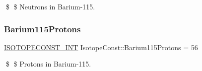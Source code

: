 \$ \$ Neutrons in Barium-\/115. \mbox{\label{group___isotope_const-_barium-_ba115_ga52f793fb7bcf6d774c15a76118316223}} 
\subsubsection{\texorpdfstring{Barium115\+Protons}{Barium115Protons}}
{\footnotesize\ttfamily \mbox{\hyperlink{group___isotope_const-_macros_ga5f18360b3e99483a35c32d789e62621c}{I\+S\+O\+T\+O\+P\+E\+C\+O\+N\+S\+T\+\_\+\+I\+NT}} Isotope\+Const\+::\+Barium115\+Protons = 56}

\$ \$ Protons in Barium-\/115. 